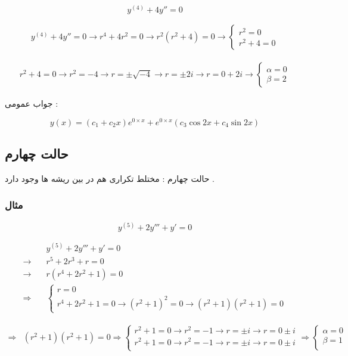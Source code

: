 \documentclass[12pt]{book}
\begin{document}
$$
y^{(4)} + 4y'' = 0
$$

\begin{align*}
y^{(4)} + 4y'' = 0 \to r^{4} + 4r^{2} = 0 \to r^{2}(r^{2} + 4) = 0 \to \begin{cases}
r^{2} = 0 \\
r^{2} + 4 = 0 
\end{cases}
\end{align*}

\begin{align*}
r^{2} + 4 = 0 \to r^{2} = -4 \to r = \pm \sqrt{-4} \to r = \pm 2 i \to r = 0 + 2 i \to \begin{cases}
\alpha = 0 \\
\beta = 2
\end{cases}
\end{align*}

جواب عمومی :

$$
y(x) = (c_{1} + c_{2}x)e^{0 \times x} + e^{0 \times x}(c_{3} \cos{2x} + c_{4} \sin{2x})
$$



\subsection{حالت چهارم}

حالت چهارم : مختلط تکراری هم در بین ریشه ها وجود دارد .

\subsubsection{مثال}

$$
y^{(5)} + 2y''' + y' = 0
$$

\begin{align*}
&y^{(5)} + 2y''' + y' = 0 \\ 
\to \quad &r^{5} + 2r^{3} + r = 0 \\ 
\to \quad &r(r^{4} + 2r^{2} + 1) = 0 \\ 
\Rightarrow &\begin{cases}
r = 0 \\
r^{4} + 2r^{2} + 1 = 0 \to (r^{2} + 1)^{2} = 0 \to (r^{2} + 1)(r^{2} + 1) = 0
\end{cases}
\end{align*}

\begin{align*}
\Rightarrow 
& (r^{2} + 1)(r^{2} + 1) = 0
\Rightarrow \begin{cases}
r^{2} + 1 = 0 \to r^{2} = -1 \to r = \pm i \to r = 0 \pm i \\
r^{2} + 1 = 0 \to r^{2} = -1 \to r = \pm i \to r = 0 \pm i \\
\end{cases} \Rightarrow 
\begin{cases}
\alpha = 0 \\
\beta = 1 \\
\end{cases}
\end{align*}
\end{document}
